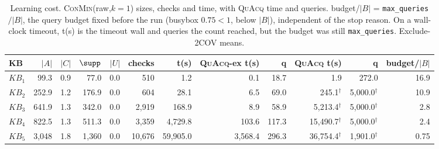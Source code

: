 \begin{table}[t]
\centering
\small
\setlength{\tabcolsep}{4pt}
\begin{tabular}{lrrrrrr rr rr r}
\toprule
KB & $|A|$ & $|C|$ & $\supp$ & $|U|$ & checks & t(s) & \textsc{QuAcq}-ex t(s) & q & \textsc{QuAcq} t(s) & q & budget/$|B|$ \tabularnewline
\midrule
$KB_{1}$ & 99.3 & 0.9 & 77.0 & 0.0 & 510 & 1.2 & 0.1 & 18.7 & 1.9 & 272.0 & 16.9 \tabularnewline
$KB_{2}$ & 252.9 & 1.2 & 176.9 & 0.0 & 604 & 28.1 & 6.5 & 69.0 & 245.1$^{\dagger}$ & 5,000.0$^{\dagger}$ & 10.9 \tabularnewline
$KB_{3}$ & 641.9 & 1.3 & 342.0 & 0.0 & 2,919 & 168.9 & 8.9 & 58.9 & 5,213.4$^{\dagger}$ & 5,000.0$^{\dagger}$ & 2.8 \tabularnewline
$KB_{4}$ & 822.5 & 1.3 & 511.3 & 0.0 & 3,359 & 4,729.8 & 103.6 & 117.3 & 15,490.7$^{\dagger}$ & 5,000.0$^{\dagger}$ & 2.4 \tabularnewline
$KB_{5}$ & 3,048 & 1.8 & 1,360 & 0.0 & 10,676 & 59,905.0 & 3,568.4 & 296.3 & 36,754.4$^{\dagger}$ & 1,901.0$^{\dagger}$ & 0.75 \tabularnewline
\bottomrule
\end{tabular}
\caption{Learning cost. \textsc{ConMin}(raw,$k{=}1$) sizes, checks and time, with \textsc{QuAcq} time and queries. budget/$|B|$ = \texttt{max\_queries}$/|B|$, the query budget fixed before the run (busybox $0.75<1$, below $|B|$), independent of the stop reason. On a wall-clock timeout, t(s) is the timeout wall and queries the count reached, but the budget was still \texttt{max\_queries}. Exclude-2COV means.}
\label{tab:eval-cost}
\end{table}
